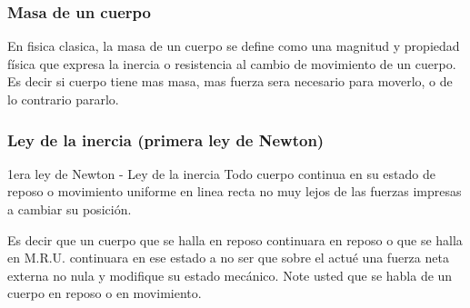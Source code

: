 \subsubsection*{Masa de un cuerpo}
En fisica clasica, la masa de un cuerpo se define como una magnitud y propiedad física que expresa la inercia o resistencia al cambio de movimiento de un cuerpo. Es decir si cuerpo tiene mas masa, mas fuerza sera necesario para moverlo, o de lo contrario pararlo.
\subsubsection*{Ley de la inercia (primera ley de Newton)}
\begin{Theorem*} {1era ley de Newton - Ley de la inercia}
	Todo cuerpo continua en su estado de reposo o movimiento uniforme en linea recta no muy lejos de las fuerzas impresas a cambiar su posición.
\end{Theorem*}
Es decir que un cuerpo que se halla en reposo continuara en reposo o que se halla en M.R.U. continuara en ese estado a no ser que sobre el actué una fuerza neta externa no nula y modifique su estado mecánico.
Note usted que se habla de un cuerpo en reposo o en movimiento.
